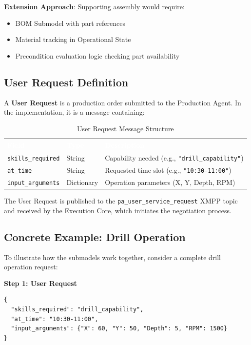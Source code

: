 \textbf{Extension Approach}: Supporting assembly would require:
\begin{itemize}
    \item BOM Submodel with part references
    \item Material tracking in Operational State
    \item Precondition evaluation logic checking part availability
\end{itemize}
\subsection{User Request Definition}
\label{subsec:user_request}

A \textbf{User Request} is a production order submitted to the Production Agent. In the implementation, it is a message containing:

\begin{table}[ht]
\centering
\caption{User Request Message Structure}
\label{tab:user_request}
\begin{tabular}{lll}
\toprule
\rowcolor{headerblue}
\textcolor{white}{Field} & \textcolor{white}{Type} & \textcolor{white}{Description} \\
\midrule
\texttt{skills\_required} & String & Capability needed (e.g., \texttt{"drill\_capability"}) \\
\texttt{at\_time} & String & Requested time slot (e.g., \texttt{"10:30-11:00"}) \\
\texttt{input\_arguments} & Dictionary & Operation parameters (X, Y, Depth, RPM) \\
\bottomrule
\end{tabular}
\end{table}

The User Request is published to the \texttt{pa\_user\_service\_request} XMPP topic and received by the Execution Core, which initiates the negotiation process.
\subsection{Concrete Example: Drill Operation}
\label{subsec:concrete_example}

To illustrate how the submodels work together, consider a complete drill operation request:

\textbf{Step 1: User Request}
\begin{lstlisting}
{
  "skills_required": "drill_capability",
  "at_time": "10:30-11:00",
  "input_arguments": {"X": 60, "Y": 50, "Depth": 5, "RPM": 1500}
}
\end{lstlisting}

